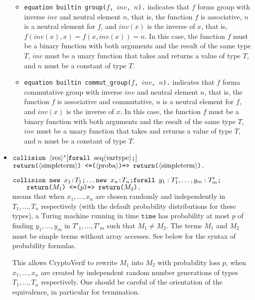 \begin{itemize}
\begin{itemize}
\item \texttt{equation builtin group($f$, $inv$, $n$).} indicates that $f$ forms group with inverse $inv$ and neutral element $n$, that is, the function $f$ is associative, $n$ is a neutral element for $f$, and $inv(x)$ is the inverse of $x$, that is, $f(inv(x),x) = f(x,inv(x)) = n$. In this case, the function $f$ must be a binary function with both arguments and the result of the same type $T$, $inv$ must be a unary function that takes and returns a value of type $T$, and $n$ must be a constant of type $T$.

\item \texttt{equation builtin commut\_group($f$, $inv$, $n$).} indicates that $f$ forma commutative group with inverse $inv$ and neutral element $n$, that is, the function $f$ is associative and commutative, $n$ is a neutral element for $f$, and $inv(x)$ is the inverse of $x$. In this case, the function $f$ must be a binary function with both arguments and the result of the same type $T$, $inv$ must be a unary function that takes and returns a value of type $T$, and $n$ must be a constant of type $T$.

\end{itemize}

\item 
$\texttt{collision }\langle\textrm{res}\rangle^*
[\texttt{forall }\textrm{seq}\langle\textrm{vartype}\rangle\texttt{;}]$\\
\null\qquad $\texttt{return(}\langle\textrm{simpleterm}\rangle\texttt{) <=(}\langle\textrm{proba}\rangle\texttt{)=> return(}\langle\textrm{simpleterm}\rangle\texttt{).}$

$\texttt{collision }\texttt{new\ }{x_1}\texttt{:}{T_1}\texttt{;}\ldots 
\texttt{new\ }{x_n}\texttt{:}{T_n}\texttt{;}
\texttt{forall }y_1:T'_1, \ldots, y_m:T'_m\texttt{;}$\\
$\null\qquad \texttt{return(}M_1\texttt{) <=(}p\texttt{)=> return(}M_2\texttt{).}$\\
means that when
$x_1, \ldots, x_n$ are chosen randomly 
and independently in $T_1, \ldots, T_n$ respectively (with the default probability distributions for these types), a Turing machine running in
time $\texttt{time}$ has probability at most $p$ of finding
$y_1, \ldots, y_m$ in $T'_1, \ldots, T'_m$ such that $M_1 \neq M_2$.
%
The terms $M_1$ and $M_2$ must be simple terms without array accesses.
See below for the syntax of probability formulas.

This allows CryptoVerif to rewrite $M_1$ into $M_2$ with probability
loss $p$, when $x_1, \ldots, x_n$ are created by independent random
number generations of types $T_1, \ldots, T_n$ respectively. One
should be careful of the orientation of the equivalence, in particular
for termination.


\end{itemize}
